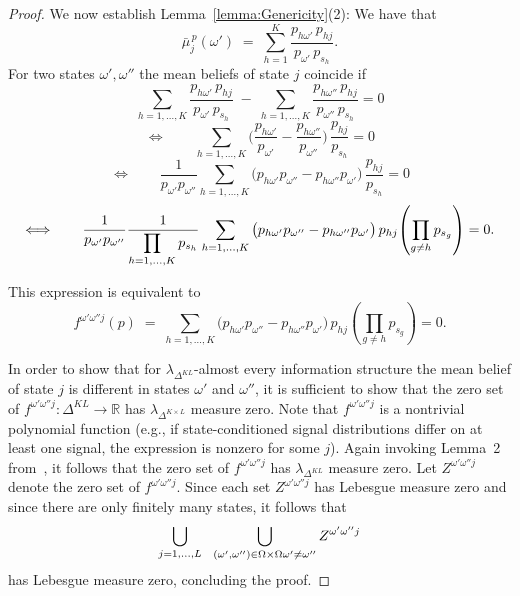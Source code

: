 \documentclass[12pt,reqno]{amsart}
\begin{document}
\begin{proof} We now establish Lemma~\ref{lemma:Genericity}(2):
\noindent We have that
\[
\bar{\mu}^{\,p}_j(\omega') \;=\; \sum_{h=1}^{K} \frac{p_{h\omega'}\, p_{hj}}{p_{\omega'}\, p_{s_h}}.
\]
For two states $\omega',\omega''$ the mean beliefs of state $j$ coincide if
\[
\sum_{h=1,\ldots,K} \frac{p_{h\omega'}\,p_{hj}}{p_{\omega'}\,p_{s_h}}
\;-\;
\sum_{h=1,\ldots,K} \frac{p_{h\omega''}\,p_{hj}}{p_{\omega''}\,p_{s_h}}
=0
\]
\[
\Longleftrightarrow\qquad
\sum_{h=1,\ldots,K} \Big(\frac{p_{h\omega'}}{p_{\omega'}}-\frac{p_{h\omega''}}{p_{\omega''}}\Big)\,
\frac{p_{hj}}{p_{s_h}} = 0
\]
\[
\Longleftrightarrow\qquad
\frac{1}{p_{\omega'}p_{\omega''}}
\sum_{h=1,\ldots,K}
\big(p_{h\omega'}p_{\omega''}-p_{h\omega''}p_{\omega'}\big)\,
\frac{p_{hj}}{p_{s_h}} = 0
\]
\[
\Longleftrightarrow\qquad
\frac{1}{p_{\omega'}p_{\omega''}} \frac{1}{\displaystyle \prod_{h=1,\ldots,K} p_{s_h}}
\\
\sum_{h=1,\ldots,K}
\big(p_{h\omega'}p_{\omega''}-p_{h\omega''}p_{\omega'}\big)\,
p_{hj}\!
\left(\prod_{g\ne h} p_{s_g}\right)=0.
\]

This expression is equivalent to
\[
f^{\omega'\omega'' j}(p)
\;=\;
\sum_{h=1,\ldots,K}
\big(p_{h\omega'}p_{\omega''}-p_{h\omega''}p_{\omega'}\big)\,p_{hj}\!
\left(\prod_{g\ne h} p_{s_g}\right)=0.
\]

In order to show that for $\lambda_{\Delta^{KL}}$-almost every information structure the mean belief of state $j$
is different in states $\omega'$ and $\omega''$, it is sufficient to show that the zero set of
$f^{\omega'\omega'' j}:\Delta^{KL}\to\mathbb{R}$ has
$\lambda_{\Delta^{K\times L}}$ measure zero. Note that $f^{\omega'\omega'' j}$ is a nontrivial
polynomial function (e.g., if state-conditioned signal distributions differ on at least one signal, the expression is nonzero for some $j$). Again invoking Lemma~2 from~\cite{MMFJET2014}, it follows that the
zero set of $f^{\omega'\omega'' j}$ has $\lambda_{\Delta^{KL}}$ measure zero. Let
$Z^{\omega'\omega'' j}$ denote the zero set of $f^{\omega'\omega'' j}$. Since each set
$Z^{\omega'\omega'' j}$ has Lebesgue measure zero and since there are only finitely many states,
it follows that
\[
\bigcup_{j=1,\ldots,L}\ \ \bigcup_{(\omega',\omega'')\in\Omega\times\Omega \\ \omega' \neq \omega''}
Z^{\omega'\omega'' j}
\]
has Lebesgue measure zero, concluding the proof.
\end{proof}
\end{document}
